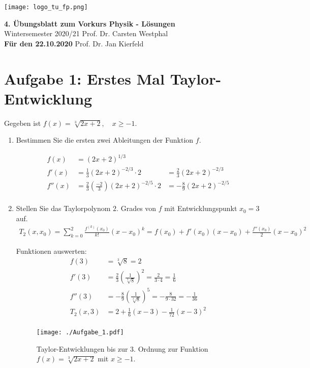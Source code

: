\documentclass[11pt,a4paper, parskip=half ]{report}
\newcommand{\GrosserAbstand}{\\[12pt]}
\begin{document}
\texttt{[image: logo\_tu\_fp.png]}
\begin{center}
\Large{\textbf{4. \"Ubungsblatt zum Vorkurs Physik - Lösungen}}
\GrosserAbstand
\normalsize
Wintersemester 2020/21 \hfill Prof. Dr. Carsten Westphal\\
\textbf{Für den 22.10.2020} \hfill Prof. Dr. Jan Kierfeld \\
\end{center}

%
%
%
%


\section*{Aufgabe 1: Erstes Mal Taylor-Entwicklung}
  Gegeben ist $f(x) = \sqrt[3]{2x + 2}, \quad x \geq -1$.
  \begin{enumerate}
    \item Bestimmen Sie die ersten zwei Ableitungen der Funktion $f$.
    
    \vspace{20pt}
    \begin{align*}
    f(x) &= (2x + 2)^{1/3} \\ 
    f'(x) &= \frac{1}{3} (2x + 2)^{-2/3} \cdot 2 &= \frac{2}{3} (2x + 2)^{-2/3} \\ 
    f''(x) &= \frac{2}{3} \left(\frac{-2}{3}\right) (2x + 2)^{-2/5} \cdot 2 &= -\frac{8}{9} (2x + 2)^{-2/5} \\ 
    \end{align*}

    \item Stellen Sie das Taylorpolynom $2.$ Grades von $f$ mit Entwicklungspunkt $x_0 = 3$ auf.
    \vspace{20pt}
    \begin{align*}
      T_2(x, x_0) = \sum_{k = 0}^{2} \frac{f^{(k)} (x_0)}{k!} (x - x_0)^k = f(x_0) + f'(x_0)(x-x_0) + \frac{f''(x_0)}{2}(x - x_0)^2 
      \end{align*}

      Funktionen auswerten: 
      \begin{align*}
        f(3) &= \sqrt[3]{8} = 2 \\
        f'(3) &= \frac{2}{3} (\frac{1}{\sqrt[3]{8}})^2 = \frac{2}{3 \cdot 4} = \frac{1}{6} \\
        f''(3) &= -\frac{8}{9} (\frac{1}{\sqrt[3]{8}})^5 = -\frac{8}{9 \cdot 32} = - \frac{1}{36} \\
          T_2(x, 3) &= 2 + \frac{1}{6}(x-3) - \frac{1}{72}(x - 3)^2 \\
          \end{align*} 

          \begin{figure}
            \centering
            \texttt{[image: ./Aufgabe\_1.pdf]}
            \caption{Taylor-Entwicklungen bis zur 3. Ordnung zur Funktion $f(x) = \sqrt[3]{2x+2}$ mit $x\geq -1$.}
            \label{fig:sqrt3}
          \end{figure}
  \end{enumerate}
\end{document}
